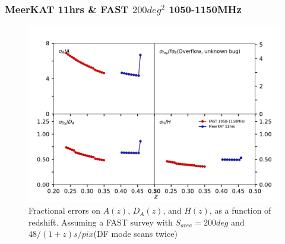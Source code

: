 \documentclass[UTF8]{beamer}
\begin{document}
    \begin{frame}
        \frametitle{MeerKAT 11hrs \& FAST $200deg^2$ 1050-1150MHz}
        \begin{figure}
            \centering
            \includegraphics[scale=0.35]{fig06-zfns_FM_pre_expt.pdf}
            \caption{Fractional errors on $A(z)$, $D_A(z)$, and $H(z)$, as a function of redshift. Assuming a FAST survey with $S_{area}=200deg$ and $48/(1+z)s/pix$(DF mode scans twice)}
        \end{figure}
    \end{frame}
    
\end{document}
